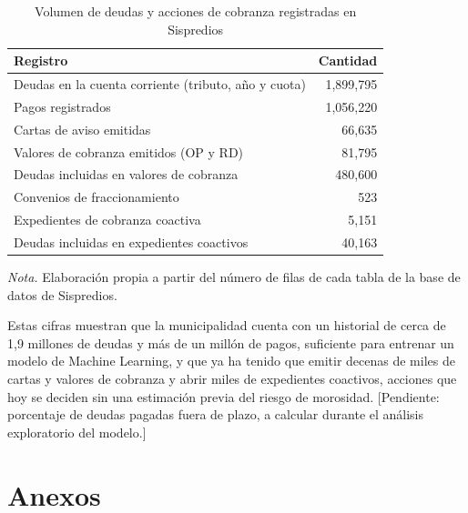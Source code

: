 \documentclass[12pt,a4paper]{report}
\begin{document}
\begin{table}[H]
\centering
\caption{Volumen de deudas y acciones de cobranza registradas en Sispredios}
\label{tab:causa4}
\begin{tabular}{p{8.5cm}r}
\toprule
\textbf{Registro} & \textbf{Cantidad} \\
\midrule
Deudas en la cuenta corriente (tributo, año y cuota) & 1,899,795 \\
Pagos registrados & 1,056,220 \\
Cartas de aviso emitidas & 66,635 \\
Valores de cobranza emitidos (OP y RD) & 81,795 \\
Deudas incluidas en valores de cobranza & 480,600 \\
Convenios de fraccionamiento & 523 \\
Expedientes de cobranza coactiva & 5,151 \\
Deudas incluidas en expedientes coactivos & 40,163 \\
\bottomrule
\end{tabular}

\vspace{0.3cm}
\footnotesize\textit{Nota.} Elaboración propia a partir del número de filas de cada tabla de la base de datos de Sispredios.
\end{table}

Estas cifras muestran que la municipalidad cuenta con un historial de cerca de 1,9 millones de deudas y más de un millón de pagos, suficiente para entrenar un modelo de Machine Learning, y que ya ha tenido que emitir decenas de miles de cartas y valores de cobranza y abrir miles de expedientes coactivos, acciones que hoy se deciden sin una estimación previa del riesgo de morosidad. [Pendiente: porcentaje de deudas pagadas fuera de plazo, a calcular durante el análisis exploratorio del modelo.]


\printbibliography[title={Referencias Bibliográficas},heading=bibintoc]


\chapter*{Anexos}
\end{document}
